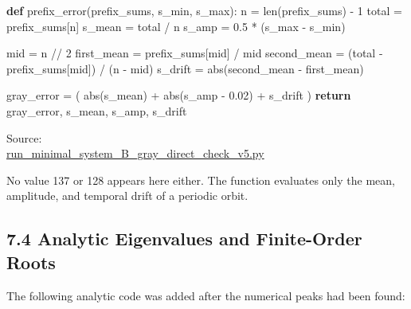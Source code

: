 \documentclass[
  10pt,
  a4paper,
]{article}
\newenvironment{Shaded}{}{}
\newcommand{\BuiltInTok}[1]{\textcolor[rgb]{0.00,0.50,0.00}{#1}}
\newcommand{\ControlFlowTok}[1]{\textcolor[rgb]{0.00,0.44,0.13}{\textbf{#1}}}
\newcommand{\DecValTok}[1]{\textcolor[rgb]{0.25,0.63,0.44}{#1}}
\newcommand{\FloatTok}[1]{\textcolor[rgb]{0.25,0.63,0.44}{#1}}
\newcommand{\KeywordTok}[1]{\textcolor[rgb]{0.00,0.44,0.13}{\textbf{#1}}}
\newcommand{\NormalTok}[1]{#1}
\newcommand{\OperatorTok}[1]{\textcolor[rgb]{0.40,0.40,0.40}{#1}}
\begin{document}
\begin{Shaded}
\begin{Highlighting}[]
\KeywordTok{def}\NormalTok{ prefix\_error(prefix\_sums, s\_min, s\_max):}
\NormalTok{    n }\OperatorTok{=} \BuiltInTok{len}\NormalTok{(prefix\_sums) }\OperatorTok{{-}} \DecValTok{1}
\NormalTok{    total }\OperatorTok{=}\NormalTok{ prefix\_sums[n]}
\NormalTok{    s\_mean }\OperatorTok{=}\NormalTok{ total }\OperatorTok{/}\NormalTok{ n}
\NormalTok{    s\_amp }\OperatorTok{=} \FloatTok{0.5} \OperatorTok{*}\NormalTok{ (s\_max }\OperatorTok{{-}}\NormalTok{ s\_min)}

\NormalTok{    mid }\OperatorTok{=}\NormalTok{ n }\OperatorTok{//} \DecValTok{2}
\NormalTok{    first\_mean }\OperatorTok{=}\NormalTok{ prefix\_sums[mid] }\OperatorTok{/}\NormalTok{ mid}
\NormalTok{    second\_mean }\OperatorTok{=}\NormalTok{ (total }\OperatorTok{{-}}\NormalTok{ prefix\_sums[mid]) }\OperatorTok{/}\NormalTok{ (n }\OperatorTok{{-}}\NormalTok{ mid)}
\NormalTok{    s\_drift }\OperatorTok{=} \BuiltInTok{abs}\NormalTok{(second\_mean }\OperatorTok{{-}}\NormalTok{ first\_mean)}

\NormalTok{    gray\_error }\OperatorTok{=}\NormalTok{ (}
        \BuiltInTok{abs}\NormalTok{(s\_mean)}
        \OperatorTok{+} \BuiltInTok{abs}\NormalTok{(s\_amp }\OperatorTok{{-}} \FloatTok{0.02}\NormalTok{)}
        \OperatorTok{+}\NormalTok{ s\_drift}
\NormalTok{    )}
    \ControlFlowTok{return}\NormalTok{ gray\_error, s\_mean, s\_amp, s\_drift}
\end{Highlighting}
\end{Shaded}

Source:\\
\href{../20260715/run_minimal_system_B_gray_direct_check_v5.py\#L63-L78}{run\_minimal\_system\_B\_gray\_direct\_check\_v5.py}

No value 137 or 128 appears here either. The function evaluates only the
mean, amplitude, and temporal drift of a periodic orbit.

\subsection{7.4 Analytic Eigenvalues and Finite-Order
Roots}\label{analytic-eigenvalues-and-finite-order-roots}

The following analytic code was added after the numerical peaks had been
found:
\end{document}
